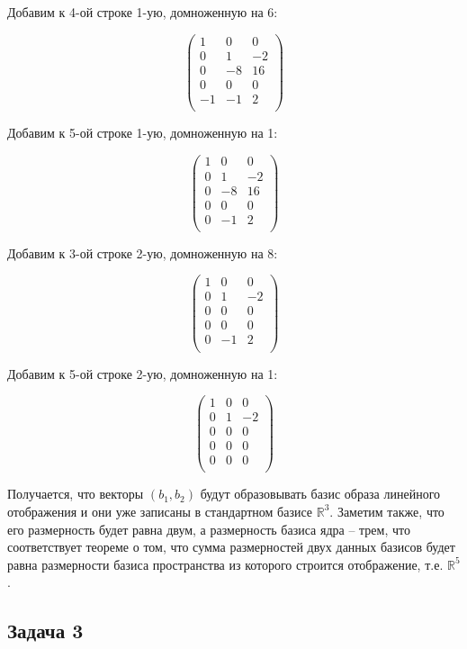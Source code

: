 	Добавим к 4-ой строке 1-ую, домноженную на 6:
	
	\[
	\begin{pmatrix}
	1 & 0 & 0 \\
	0 & 1 & -2 \\
	0 & -8 & 16 \\
	0 & 0 & 0 \\
	-1 & -1 & 2 \\
	\end{pmatrix}
	\]
	
	Добавим к 5-ой строке 1-ую, домноженную на 1:
	
	\[
	\begin{pmatrix}
	1 & 0 & 0 \\
	0 & 1 & -2 \\
	0 & -8 & 16 \\
	0 & 0 & 0 \\
	0 & -1 & 2 \\
	\end{pmatrix}
	\]
	
	Добавим к 3-ой строке 2-ую, домноженную на 8:
	
	\[
	\begin{pmatrix}
	1 & 0 & 0 \\
	0 & 1 & -2 \\
	0 & 0 & 0 \\
	0 & 0 & 0 \\
	0 & -1 & 2 \\
	\end{pmatrix}
	\]
	
	Добавим к 5-ой строке 2-ую, домноженную на 1:
	
	\[
	\begin{pmatrix}
	1 & 0 & 0 \\
	0 & 1 & -2 \\
	0 & 0 & 0 \\
	0 & 0 & 0 \\
	0 & 0 & 0 \\
	\end{pmatrix}
	\]
	
	Получается, что векторы $(b_1, b_2)$ будут образовывать базис образа линейного отображения и они уже записаны в стандартном базисе $\mathbb{R}^3$. Заметим также, что его размерность будет равна двум, а размерность базиса ядра -- трем, что соответствует теореме о том, что  сумма размерностей двух данных базисов будет равна размерности базиса пространства из которого строится отображение, т.е. $\mathbb{R}^5$.
	
	\subsection{Задача 3}
	
